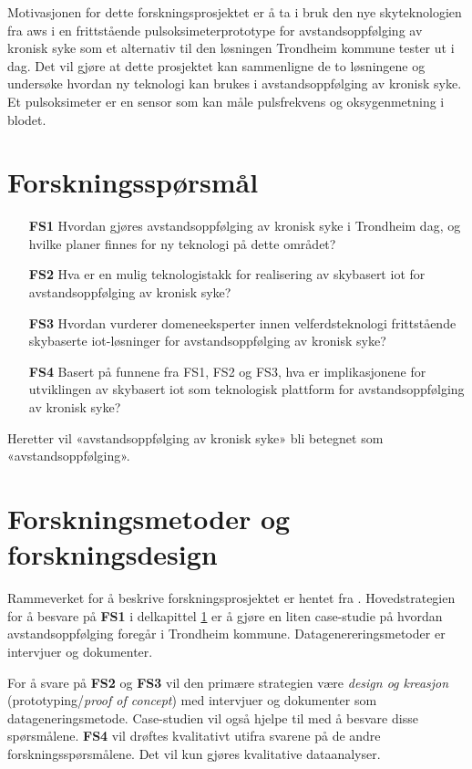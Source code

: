 Motivasjonen for dette forskningsprosjektet er å ta i bruk den nye skyteknologien fra \gls{aws} i en frittstående
pulsoksimeterprototype for avstandsoppfølging av kronisk syke som et alternativ til den løsningen Trondheim
kommune tester ut i dag. Det vil gjøre at dette prosjektet kan sammenligne de to løsningene og undersøke hvordan ny
teknologi kan brukes i avstandsoppfølging av kronisk syke. Et pulsoksimeter er en sensor som kan måle pulsfrekvens og oksygenmetning i blodet. 

\section{Forskningsspørsmål}
\label{sec:res_questions}

\begin{enumerate}
  \item[\textbf{FS1}] Hvordan gjøres avstandsoppfølging av kronisk syke i Trondheim dag,
     og hvilke planer finnes for ny teknologi på dette området?
  \item[\textbf{FS2}] Hva er en mulig teknologistakk for realisering av skybasert \gls{iot} for avstandsoppfølging av kronisk syke?
  \item[\textbf{FS3}] Hvordan vurderer domeneeksperter innen velferdsteknologi frittstående skybaserte \gls{iot}-løsninger for avstandsoppfølging av kronisk syke?
  \item[\textbf{FS4}] Basert på funnene fra FS1, FS2 og FS3, hva er implikasjonene for utviklingen av skybasert \gls{iot} som teknologisk plattform
    for avstandsoppfølging av kronisk syke?
\end{enumerate}

Heretter vil «avstandsoppfølging av kronisk syke» bli betegnet som «avstandsoppfølging».

\section{Forskningsmetoder og forskningsdesign}
Rammeverket for å beskrive forskningsprosjektet er hentet fra \citet{oates}. Hovedstrategien for å besvare på \textbf{FS1} i
delkapittel \ref{sec:res_questions} er å gjøre en liten case-studie på hvordan avstandsoppfølging foregår i Trondheim kommune. Datagenereringsmetoder
er intervjuer og dokumenter. 

For å svare på \textbf{FS2} og \textbf{FS3} vil den primære strategien være \textit{design og kreasjon} (prototyping/\textit{proof of concept})
med intervjuer og dokumenter som datageneringsmetode. Case-studien vil også hjelpe til med å besvare disse spørsmålene. \textbf{FS4} vil drøftes kvalitativt 
utifra svarene på de andre forskningsspørsmålene. Det vil kun gjøres kvalitative dataanalyser.

